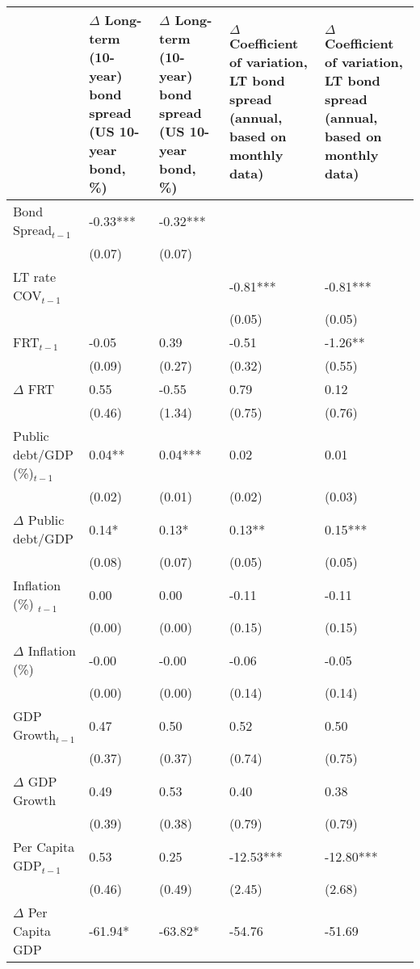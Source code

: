 {\tiny
\begin{tabular}{lp{2.5cm}p{2.5cm}p{2.5cm}p{2.5cm}}
  \hline
 & $\Delta$ Long-term (10-year) bond spread (US 10-year bond, \%) & $\Delta$ Long-term (10-year) bond spread (US 10-year bond, \%) & $\Delta$ Coefficient of variation, LT bond spread (annual, based on monthly data) & $\Delta$ Coefficient of variation, LT bond spread (annual, based on monthly data) \\ 
  \hline
Bond Spread$_{t-1}$ & -0.33*** & -0.32*** &  &  \\ 
   & (0.07) & (0.07) &  &  \\ 
  LT rate COV$_{t-1}$ &  &  & -0.81*** & -0.81*** \\ 
   &  &  & (0.05) & (0.05) \\ 
  FRT$_{t-1}$ & -0.05 & 0.39 & -0.51 & -1.26** \\ 
   & (0.09) & (0.27) & (0.32) & (0.55) \\ 
  $\Delta$ FRT & 0.55 & -0.55 & 0.79 & 0.12 \\ 
   & (0.46) & (1.34) & (0.75) & (0.76) \\ 
  Public debt/GDP (\%)$_{t-1}$ & 0.04** & 0.04*** & 0.02 & 0.01 \\ 
   & (0.02) & (0.01) & (0.02) & (0.03) \\ 
  $\Delta$ Public debt/GDP & 0.14* & 0.13* & 0.13** & 0.15*** \\ 
   & (0.08) & (0.07) & (0.05) & (0.05) \\ 
  Inflation (\%) $_{t-1}$ & 0.00 & 0.00 & -0.11 & -0.11 \\ 
   & (0.00) & (0.00) & (0.15) & (0.15) \\ 
  $\Delta$ Inflation (\%) & -0.00 & -0.00 & -0.06 & -0.05 \\ 
   & (0.00) & (0.00) & (0.14) & (0.14) \\ 
  GDP Growth$_{t-1}$ & 0.47 & 0.50 & 0.52 & 0.50 \\ 
   & (0.37) & (0.37) & (0.74) & (0.75) \\ 
  $\Delta$ GDP Growth & 0.49 & 0.53 & 0.40 & 0.38 \\ 
   & (0.39) & (0.38) & (0.79) & (0.79) \\ 
  Per Capita GDP$_{t-1}$ & 0.53 & 0.25 & -12.53*** & -12.80*** \\ 
   & (0.46) & (0.49) & (2.45) & (2.68) \\ 
  $\Delta$ Per Capita GDP & -61.94* & -63.82* & -54.76 & -51.69 \\ 

\end{tabular}}
